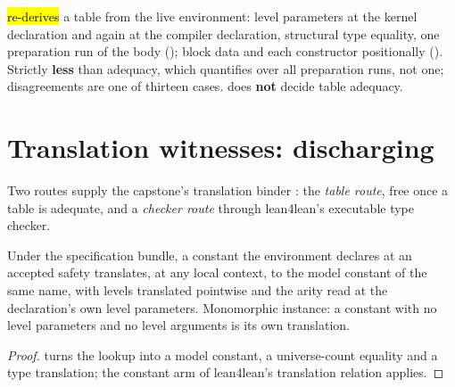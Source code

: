 \begin{definition}\label{def:Witness-SourceTable-check}
 \leanok
{}
  \hl{re-derives} a table from the live environment: level
parameters at the kernel declaration and again at the compiler declaration, structural type
equality, one preparation run of the body (); block data and each constructor
positionally ().
 Strictly \textbf{less} than adequacy, which quantifies over all preparation runs, not
one; disagreements are one of thirteen  cases.  does
\textbf{not} decide table adequacy.
\end{definition}

\section{Translation witnesses: discharging }
\label{sec:capstone:trwitness}

Two routes supply the capstone's translation binder : the \emph{table route}, free once a
table is adequate, and a \emph{checker route} through lean4lean's executable type checker.

\begin{lemma}\label{lem:Witness-trExprS_const}
 \leanok
{}
Under the specification bundle, a constant the environment declares at an accepted safety translates,
at any local context, to the model constant of the same name, with levels translated pointwise and
the arity read at the declaration's own level parameters. Monomorphic instance: a constant with no
level parameters and no level arguments is its own translation.
\end{lemma}

\begin{proof} \leanok
{}
  turns the lookup into a model constant, a universe-count equality
and a type translation; the constant arm of lean4lean's translation relation applies.
\end{proof}

